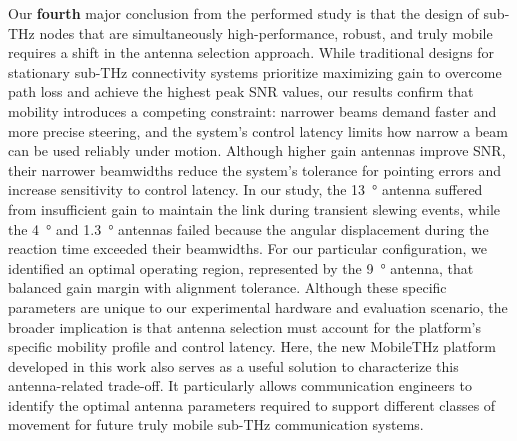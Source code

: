 \documentclass[fleqn,10pt]{wlscirep}
\begin{document}
Our \textbf{fourth} major conclusion from the performed study is that the design of sub-THz nodes that are simultaneously high-performance, robust, and truly mobile requires a shift in the antenna selection approach. While traditional designs for stationary sub-THz connectivity systems prioritize maximizing gain to overcome path loss and achieve the highest peak SNR values, our results confirm that mobility introduces a competing constraint: narrower beams demand faster and more precise steering, and the system's control latency limits how narrow a beam can be used reliably under motion. Although higher gain antennas improve SNR, their narrower beamwidths reduce the system's tolerance for pointing errors and increase sensitivity to control latency. In our study, the \SI{13}{\degree} antenna suffered from insufficient gain to maintain the link during transient slewing events, while the \SI{4}{\degree} and \SI{1.3}{\degree} antennas failed because the angular displacement during the reaction time exceeded their beamwidths. For our particular configuration, we identified an optimal operating region, represented by the \SI{9}{\degree} antenna, that balanced gain margin with alignment tolerance. Although these specific parameters are unique to our experimental hardware and evaluation scenario, the broader implication is that antenna selection must account for the platform's specific mobility profile and control latency. Here, the new MobileTHz platform developed in this work also serves as a useful solution to characterize this antenna-related trade-off. It particularly allows communication engineers to identify the optimal antenna parameters required to support different classes of movement for future truly mobile sub-THz communication systems.
\end{document}
